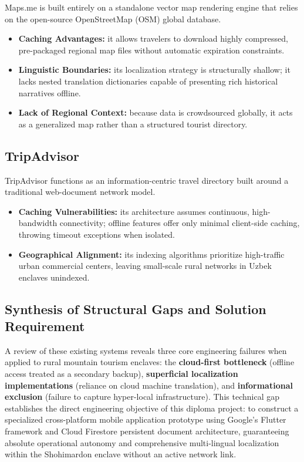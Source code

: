 \documentclass[12pt,a4paper,oneside]{report}
\begin{document}
Maps.me is built entirely on a standalone vector map rendering engine that relies on the
open-source OpenStreetMap (OSM) global database.

\begin{itemize}[leftmargin=1.4em]
  \item \textbf{Caching Advantages:} it allows travelers to download highly compressed,
        pre-packaged regional map files without automatic expiration constraints.
  \item \textbf{Linguistic Boundaries:} its localization strategy is structurally shallow;
        it lacks nested translation dictionaries capable of presenting rich historical
        narratives offline.
  \item \textbf{Lack of Regional Context:} because data is crowdsourced globally, it acts
        as a generalized map rather than a structured tourist directory.
\end{itemize}

\subsection{TripAdvisor}

TripAdvisor functions as an information-centric travel directory built around a
traditional web-document network model.

\begin{itemize}[leftmargin=1.4em]
  \item \textbf{Caching Vulnerabilities:} its architecture assumes continuous,
        high-bandwidth connectivity; offline features offer only minimal client-side
        caching, throwing timeout exceptions when isolated.
  \item \textbf{Geographical Alignment:} its indexing algorithms prioritize high-traffic
        urban commercial centers, leaving small-scale rural networks in Uzbek enclaves
        unindexed.
\end{itemize}

\subsection{Synthesis of Structural Gaps and Solution Requirement}

A review of these existing systems reveals three core engineering failures when applied
to rural mountain tourism enclaves: the \textbf{cloud-first bottleneck} (offline access
treated as a secondary backup), \textbf{superficial localization implementations}
(reliance on cloud machine translation), and \textbf{informational exclusion} (failure to
capture hyper-local infrastructure). This technical gap establishes the direct engineering
objective of this diploma project: to construct a specialized cross-platform mobile
application prototype using Google's Flutter framework and Cloud Firestore persistent
document architecture, guaranteeing absolute operational autonomy and comprehensive
multi-lingual localization within the Shohimardon enclave without an active network link.
\end{document}
